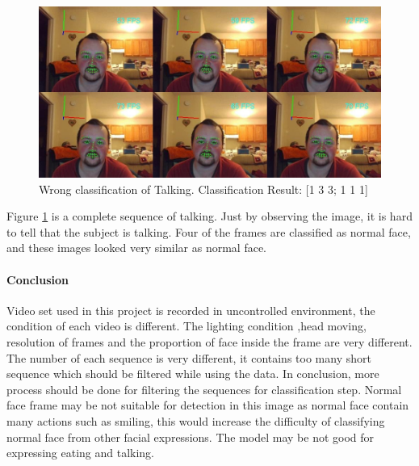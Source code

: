 \begin{figure}[ht]
\centering
\includegraphics[width = \textwidth]{imgs/Wrong_T00.jpg}
\caption{Wrong classification of Talking. Classification Result: [1 3 3; 1 1 1]}
\label{fig:EXPT}
\end{figure}
\newline
Figure \ref{fig:EXPT} is a complete sequence of talking. Just by observing the image, it is hard to tell that the subject is talking. Four of the frames are classified as normal face, and these images looked very similar as normal face.
\paragraph{Conclusion}
Video set used in this project is recorded in uncontrolled environment, the condition of each video is different. The lighting condition ,head moving, resolution of frames and the proportion of face inside the frame are very different. The number of each sequence is very different, it contains too many short sequence which should be filtered while using the data. In conclusion, more process should be done for filtering the sequences for classification step. Normal face frame may be not suitable for detection in this image as normal face contain many actions such as smiling, this would increase the difficulty of classifying normal face from other facial expressions. The model may be not good for expressing eating and talking.